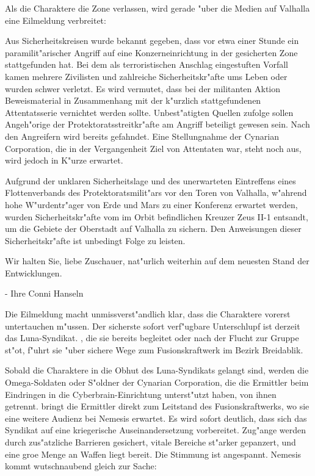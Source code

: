 
Als die Charaktere die Zone verlassen, wird gerade "uber die Medien auf Valhalla eine Eilmeldung verbreitet:

\begin{speech}
Aus Sicherheitskreisen wurde bekannt gegeben, dass vor etwa einer Stunde ein paramilit"arischer Angriff auf eine Konzerneinrichtung in der gesicherten Zone stattgefunden hat. Bei dem als terroristischen Anschlag eingestuften Vorfall kamen mehrere Zivilisten und zahlreiche Sicherheitskr"afte ums Leben oder wurden schwer verletzt. Es wird vermutet, dass bei der militanten Aktion Beweismaterial in Zusammenhang mit der k"urzlich stattgefundenen Attentatsserie vernichtet werden sollte. Unbest"atigten Quellen zufolge sollen Angeh"orige der Protektoratsstreitkr"afte am Angriff beteiligt gewesen sein. Nach den Angreifern wird bereits gefahndet. Eine Stellungnahme der Cynarian Corporation, die in der Vergangenheit Ziel von Attentaten war, steht noch aus, wird jedoch in K"urze erwartet.

\nopagebreak
Aufgrund der unklaren Sicherheitslage und des unerwarteten Eintreffens eines Flottenverbands des Protektoratsmilit"ars vor den Toren von Valhalla, w"ahrend hohe W"urdentr"ager von Erde und Mars zu einer Konferenz erwartet werden, wurden Sicherheitskr"afte vom im Orbit befindlichen Kreuzer Zeus II-1 entsandt, um die Gebiete der Oberstadt auf Valhalla zu sichern. Den Anweisungen dieser Sicherheitskr"afte ist unbedingt Folge zu leisten.

\nopagebreak
Wir halten Sie, liebe Zuschauer, nat"urlich weiterhin auf dem neuesten Stand der Entwicklungen.

\nopagebreak
- Ihre Conni Hanseln
\end{speech}

Die Eilmeldung macht unmissverst"andlich klar, dass die Charaktere vorerst untertauchen m"ussen. Der sicherste sofort verf"ugbare Unterschlupf ist derzeit das Luna-Syndikat. \xl{}, die sie bereits begleitet oder nach der Flucht zur Gruppe st"o\3t, f"uhrt sie "uber sichere Wege zum Fusionskraftwerk im Bezirk Breidablik.

Sobald die Charaktere in die Obhut des Luna-Syndikats gelangt sind, werden die Omega-Soldaten oder S"oldner der Cynarian Corporation, die die Ermittler beim Eindringen in die Cyberbrain-Einrichtung unterst"utzt haben, von ihnen getrennt. \xl{} bringt die Ermittler direkt zum Leitstand des Fusionskraftwerks, wo sie eine weitere Audienz bei Nemesis erwartet. Es wird sofort deutlich, dass sich das Syndikat auf eine kriegerische Auseinandersetzung vorbereitet. Zug"ange werden durch zus"atzliche Barrieren gesichert, vitale Bereiche st"arker gepanzert, und eine gro\3e Menge an Waffen liegt bereit. Die Stimmung ist angespannt. Nemesis kommt wutschnaubend gleich zur Sache:

